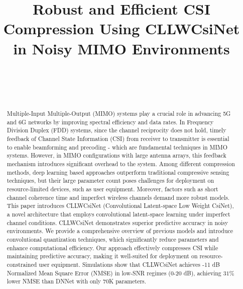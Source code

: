 \documentclass[lettersize,journal]{IEEEtran}
\begin{document}
\title{Robust and Efficient CSI Compression Using CLLWCsiNet in Noisy MIMO Environments}

\author{
	\\
	\\
	\\
}

\maketitle
\begin{abstract}
Multiple-Input Multiple-Output (MIMO) systems play a crucial role in advancing 5G and 6G networks by improving spectral efficiency and data rates. 
In Frequency Division Duplex (FDD) systems, since the channel reciprocity does not hold, timely feedback of Channel State Information (CSI) from receiver to transmitter is essential
to enable beamforming and precoding - which are fundamental techniques in MIMO systems. 
However, in MIMO configurations with large antenna arrays, this feedback mechanism introduces significant overhead to the system.
Among different compression methods, deep learning based approaches outperform traditional compressive sensing techniques, but 
their large parameter count poses challenges for deployment on resource-limited devices, such as user equipment. 
Moreover, factors such as short channel coherence time and imperfect wireless channels demand more robust models.
This paper introduces CLLWCsiNet (Convolutional Latent-space Low Weight CsiNet), a novel architecture that employs convolutional latent-space learning under imperfect channel conditions. CLLWCsiNet demonstrates superior predictive accuracy in noisy environments. 
We provide a comprehensive overview of previous models and introduce convolutional quantization techniques, which significantly reduce parameters and enhance computational efficiency. Our approach effectively compresses CSI while maintaining predictive accuracy, making it well-suited for deployment on resource-constrained user equipment.
Simulations show that CLLWCsiNet achieves -11 dB Normalized Mean Square Error (NMSE) in low-SNR regimes (0-20 dB), achieving $31\%$ lower NMSE than DNNet with only 70K parameters. 

\end{abstract}
\end{document}
